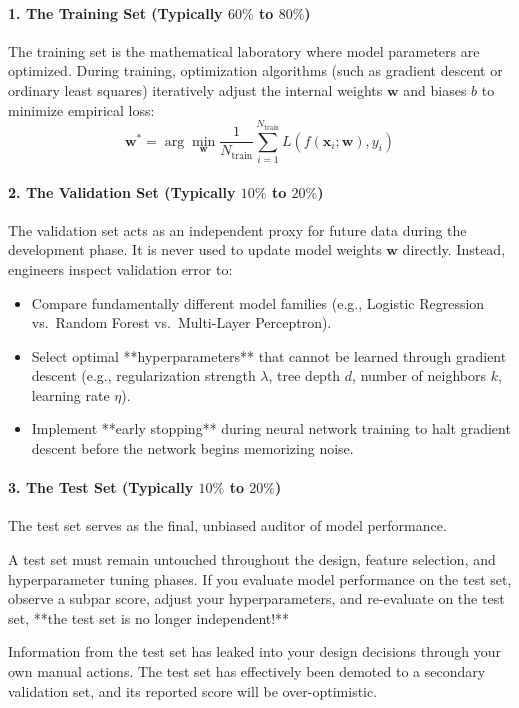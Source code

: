 \paragraph{1. The Training Set (Typically $60\%$ to $80\%$)}
The training set is the mathematical laboratory where model parameters are optimized. During training, optimization algorithms (such as gradient descent or ordinary least squares) iteratively adjust the internal weights $\mathbf{w}$ and biases $b$ to minimize empirical loss:
\begin{equation}
\mathbf{w}^* = \arg\min_{\mathbf{w}} \frac{1}{N_{\text{train}}} \sum_{i=1}^{N_{\text{train}}} L\left( f(\mathbf{x}_i; \mathbf{w}), y_i \right)\label{eq:train_empirical_loss}
\end{equation}

\paragraph{2. The Validation Set (Typically $10\%$ to $20\%$)}
The validation set acts as an independent proxy for future data during the development phase. It is never used to update model weights $\mathbf{w}$ directly. Instead, engineers inspect validation error to:
\begin{itemize}
    \item Compare fundamentally different model families (e.g., Logistic Regression vs.\ Random Forest vs.\ Multi-Layer Perceptron).
    \item Select optimal **hyperparameters** that cannot be learned through gradient descent (e.g., regularization strength $\lambda$, tree depth $d$, number of neighbors $k$, learning rate $\eta$).
    \item Implement **early stopping** during neural network training to halt gradient descent before the network begins memorizing noise.
\end{itemize}

\paragraph{3. The Test Set (Typically $10\%$ to $20\%$)}
The test set serves as the final, unbiased auditor of model performance. 
\begin{warning}
A test set must remain untouched throughout the design, feature selection, and hyperparameter tuning phases. If you evaluate model performance on the test set, observe a subpar score, adjust your hyperparameters, and re-evaluate on the test set, **the test set is no longer independent!** 

Information from the test set has leaked into your design decisions through your own manual actions. The test set has effectively been demoted to a secondary validation set, and its reported score will be over-optimistic.
\end{warning}

